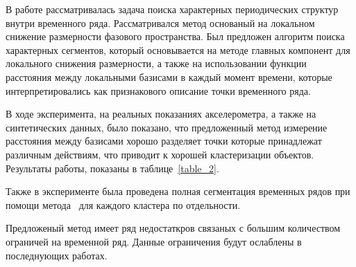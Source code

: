 \documentclass[12pt, twoside]{article}
\numberwithin{equation}{section}
\begin{document}
В работе рассматривалась задача поиска характерных периодических структур внутри временного ряда. Рассматривался метод основаный на локальном снижение размерности фазового пространства. Был предложен алгоритм поиска характерных сегментов, который основывается на методе главных компонент для локального снижения размерности, а также на использовании функции расстояния между локальными базисами в каждый момент времени, которые интерпретировались как признакового описание точки временного ряда.

В ходе эксперимента, на реальных показаниях акселерометра, а также на синтетических данных, было показано, что предложенный метод измерение расстояния между базисами хорошо разделяет точки которые принадлежат различным действиям, что приводит к хорошей кластеризации объектов. Результаты работы, показаны в таблице~\ref{table_2}.

Также в эксперименте была проведена полная сегментация временных рядов при помощи метода~\cite{motrenko2015} для каждого кластера по отдельности.

Предложеный метод имеет ряд недостаткров связаных с большим количеством ограничей на временной ряд. Данные ограничения будут ослаблены в последнующих работах.



\appendix
\setcounter{theorem}{0}
\end{document}

